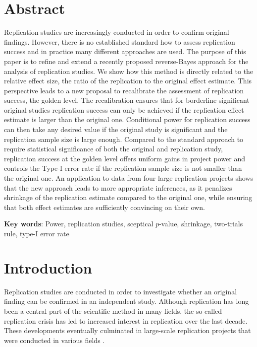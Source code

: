 



\section*{Abstract}
Replication studies are increasingly conducted in order to confirm original
findings. However, there is no established standard how to assess replication
success and in practice many different approaches are used. The purpose of this
paper is to refine and extend a recently proposed reverse-Bayes approach for the
analysis of replication studies. We show how this method is directly related to
the relative effect size, the ratio of the replication to the original effect
estimate. This perspective leads to a new proposal to recalibrate the assessment
of replication success, the golden level. The recalibration ensures that for
borderline significant original studies replication success can only be achieved
if the replication effect estimate is larger than the original one. Conditional
power for replication success can then take any desired value if the original
study is significant and the replication sample size is large enough. Compared
to the standard approach to require statistical significance of both the
original and replication study, replication success at the golden level offers
uniform gains in project power and controls the Type-I error rate if the
replication sample size is not smaller than the original one. An application to
data from four large replication projects shows that the new approach leads to
more appropriate inferences, as it penalizes shrinkage of the replication
estimate compared to the original one, while ensuring that both effect estimates
are sufficiently convincing on their own.

\textbf{Key words}: Power, replication studies, sceptical $p$-value, shrinkage,
two-trials rule, type-I error rate


\section{Introduction}
Replication studies are conducted in order to investigate whether an original
finding can be confirmed in an independent study. Although replication has long
been a central part of the scientific method in many fields, the so-called
replication crisis \citep{Ioannidis2005, Begley2015} has led to increased
interest in replication over the last decade. These developments eventually
culminated in large-scale replication projects that were conducted in various
fields \citep{Errington2014, Klein2014, Opensc2015, Ebersole2016, Camerer2016,
  Camerer2018, Cova2018, Klein2018}.

